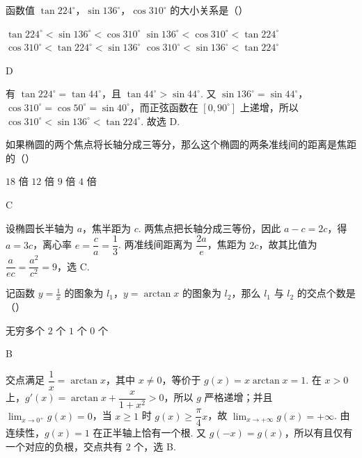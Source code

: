\documentclass[UTF8,a4paper,oneside,11pt]{ctexbook}
\begin{document}
\begin{problem}
函数值 \(\tan 224^{\circ}\)，\(\sin 136^{\circ}\)，\(\cos 310^{\circ}\) 的大小关系是（\quad）

\choices
    {\(\tan 224^{\circ} < \sin 136^{\circ} < \cos 310^{\circ}\)}
    {\(\sin 136^{\circ} < \cos 310^{\circ} < \tan 224^{\circ}\)}
    {\(\cos 310^{\circ} < \tan 224^{\circ} < \sin 136^{\circ}\)}
    {\(\cos 310^{\circ} < \sin 136^{\circ} < \tan 224^{\circ}\)}
\end{problem}

\begin{answer}
D
\end{answer}

\begin{solution}
有 \(\tan224^{\circ}=\tan44^{\circ}\)，且 \(\tan44^{\circ}>\sin44^{\circ}\). 又 \(\sin136^{\circ}=\sin44^{\circ}\)，\(\cos310^{\circ}=\cos50^{\circ}=\sin40^{\circ}\)，而正弦函数在 \([0,90^{\circ}]\) 上递增，所以 \(\cos310^{\circ}<\sin136^{\circ}<\tan224^{\circ}\). 故选 D.
\end{solution}

\begin{problem}
如果椭圆的两个焦点将长轴分成三等分，那么这个椭圆的两条准线间的距离是焦距的（\quad）

\choices
    {\(18\) 倍}
    {\(12\) 倍}
    {\(9\) 倍}
    {\(4\) 倍}
\end{problem}

\begin{answer}
C
\end{answer}

\begin{solution}
设椭圆长半轴为 \(a\)，焦半距为 \(c\). 两焦点把长轴分成三等份，因此 \(a-c=2c\)，得 \(a=3c\)，离心率 \(e=\dfrac ca=\dfrac13\). 两准线间距离为 \(\dfrac{2a}{e}\)，焦距为 \(2c\)，故其比值为 \(\dfrac{a}{ec}=\dfrac{a^2}{c^2}=9\)，选 C.
\end{solution}

\begin{problem}
记函数 \(y = \frac{1}{x}\) 的图象为 \(l_1\)，\(y = \arctan x\) 的图象为 \(l_2\)，那么 \(l_1\) 与 \(l_2\) 的交点个数是（\quad）

\choices
    {无穷多个}
    {\(2\) 个}
    {\(1\) 个}
    {\(0\) 个}
\end{problem}

\begin{answer}
B
\end{answer}

\begin{solution}
交点满足 \(\dfrac1x=\arctan x\)，其中 \(x\ne0\)，等价于 \(g(x)=x\arctan x=1\). 在 \(x>0\) 上，\(g'(x)=\arctan x+\dfrac{x}{1+x^2}>0\)，所以 \(g\) 严格递增；并且 \(\lim_{x\to0^+}g(x)=0\)，当 \(x\geqslant1\) 时 \(g(x)\geqslant\dfrac\pi4x\)，故 \(\lim_{x\to+\infty}g(x)=+\infty\). 由连续性，\(g(x)=1\) 在正半轴上恰有一个根. 又 \(g(-x)=g(x)\)，所以有且仅有一个对应的负根，交点共有 \(2\) 个，选 B.
\end{solution}
\end{document}
